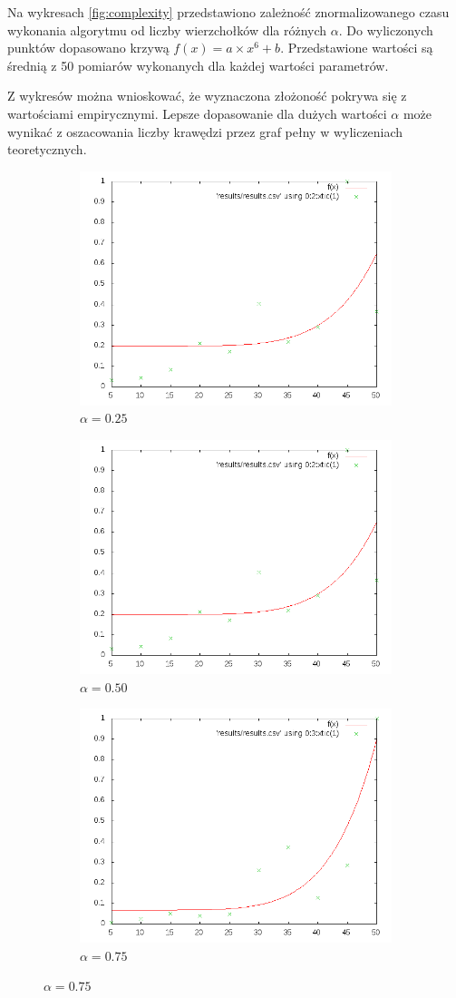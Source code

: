 \documentclass{llncs}
\begin{document}
Na wykresach \autoref{fig:complexity} przedstawiono zależność znormalizowanego czasu wykonania algorytmu od liczby wierzchołków dla różnych $\alpha$. Do wyliczonych punktów dopasowano krzywą $f(x) = a\times x^6 + b$. Przedstawione wartości są średnią z 50 pomiarów wykonanych dla każdej wartości parametrów.

Z wykresów można wnioskować, że wyznaczona złożoność pokrywa się z wartościami empirycznymi. Lepsze dopasowanie dla dużych wartości $\alpha$ może wynikać z oszacowania liczby krawędzi przez graf pełny w wyliczeniach teoretycznych.

\begin{figure}
\centering
\begin{subfigure}
  \centering
  \includegraphics[width=.4\linewidth]{img/25.png}
  \caption{$\alpha=0.25$}
  \label{fig:sub1}
\end{subfigure}%
\begin{subfigure}
  \centering
  \includegraphics[width=.4\linewidth]{img/50.png}
  \caption{$\alpha=0.50$}
  \label{fig:sub2}
\end{subfigure}
%
\begin{subfigure}
  \centering
  \includegraphics[width=.4\linewidth]{img/75.png}
  \caption{$\alpha=0.75$}
  \label{fig:sub2}
\end{subfigure}

\end{figure}
\end{document}
